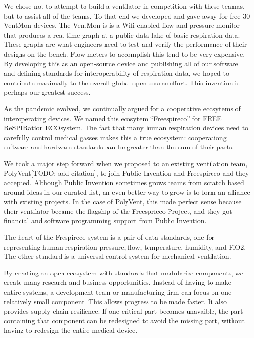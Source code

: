 \documentclass[
	fontsize=10pt, %
	twoside=false, %
	secnumdepth=1, %
]{kaobook}
\begin{document}
We chose not to attempt to build a ventilator in competition with
these teamas, but to assist all of the teams.
To that end we developed and gave away for free 30 VentMon devices.
The VentMon is is a Wifi-enabled flow and pressure monitor that
produces a real-time graph at a public data lake of basic respiration
data.
These graphs are what engineers need to test and verify the performance
of their designs on the bench.
Flow meters to accomplish this tend to be very expensive.
By developing this as an open-source device and publishing all of our
software and defining standards for interoperability of respiration
data, we hoped to contribute maximally to the overall global
open source effort. This invention is perhaps our greatest success.

As the pandemic evolved, we continually argued for a cooperative
ecosytems of interoperating devices.
We named this ecosytem ``Freespireco'' for FREE ReSPIRation ECOsystem.
The fact that many human respiration devices need to carefully control
medical gasses makes this a true ecosystem: cooperationg software and
hardware standards can be greater than the sum of their parts.

We took a major step forward when we proposed to an existing
ventilation team, PolyVent[TODO: add citation], to join Public Invention and Freespireco and they accepted.
Although Public Invention sometimes grows teams from scratch
based around ideas in our curated list, an even better way
to grow is to form an alliance with existing projects.
In the case of PolyVent, this made perfect sense because
their ventilator became the flagship of the Freesprieco Project, and
they got financial and software programming support from Public Invention.

The heart of the Frespireco system is a pair of data standards, one for
representing human respiration pressure, flow, temperature, humidity, and
FiO2. The other standard is a universal control system for mechanical ventilation.

By creating an open ecosystem with standards that modularize components,
we create many research and business opportunities. Instead of having to make
entire systems, a development team or manufacturing firm can focus on one
relatively small component. This allows progress to be made faster.
It also provides supply-chain resilience. If one critical part becomes unavaible,
the part containing that component can be redesigned to avoid the missing
part, without having to redesign the entire medical device.
\end{document}
